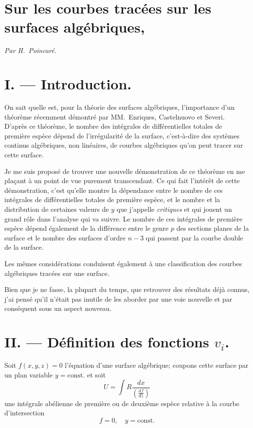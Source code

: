 \documentclass{article}
\begin{document}
\section*{Sur les courbes tracées sur les surfaces algébriques,}

\begin{center}
\emph{Par H.~Poincaré.}
\end{center}

\section*{I. --- Introduction.}

On sait quelle est, pour la théorie des surfaces algébriques, l'importance d'un théorème récemment démontré par MM.~Enriques, Castelnuovo et Severi. D'après ce théorème, le nombre des intégrales de différentielles totales de première espèce dépend de l'irrégularité de la surface, c'est-à-dire des systèmes continus algébriques, non linéaires, de courbes algébriques qu'on peut tracer sur cette surface.

Je me suis proposé de trouver une nouvelle démonstration de ce théorème en me plaçant à un point de vue purement transcendant. Ce qui fait l'intérêt de cette démonstration, c'est qu'elle montre la dépendance entre le nombre de ces intégrales de différentielles totales de première espèce, et le nombre et la distribution de certaines valeurs de $y$ que j'appelle \emph{critiques} et qui jouent un grand rôle dans l'analyse qui va suivre. Le nombre de ces intégrales de première espèce dépend également de la différence entre le genre $p$ des sections planes de la surface et le nombre des surfaces d'ordre $n - 3$ qui passent par la courbe double de la surface.

Les mêmes considérations conduisent également à une classification des courbes algébriques tracées sur une surface.

Bien que je ne fasse, la plupart du temps, que retrouver des résultats déjà connus, j'ai pensé qu'il n'était pas inutile de les aborder par une voie nouvelle et par conséquent sous un aspect nouveau.

\section*{II. --- Définition des fonctions $v_i$.}

Soit $f(x, y, z) = 0$ l'équation d'une surface algébrique; coupons cette surface par un plan variable $y = \text{const.}$ et soit
\[
U = \int R \frac{dx}{\left(\frac{df}{dz}\right)} \tag{1}
\]
une intégrale abélienne de première ou de deuxième espèce relative à la courbe d'intersection
\[
f = 0, \quad y = \text{const.} \tag{2}
\]
\end{document}
